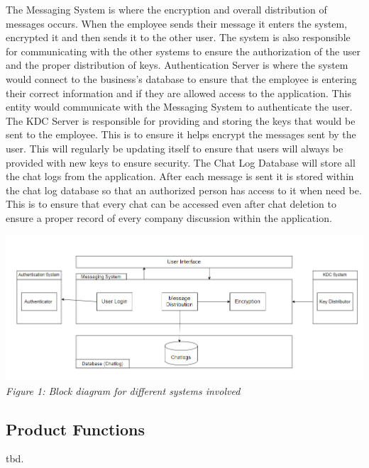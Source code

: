 \documentclass[]{article}
\begin{document}
\indent The Messaging System is where the encryption and overall distribution of messages occurs. When the employee sends their message it enters the system, encrypted it and then sends it to the other user. The system is also responsible for communicating with the other systems to ensure the authorization of the user and the proper distribution of keys.
\newline
\newline
\indent Authentication Server is where the system would connect to the business’s database to ensure that the employee is entering their correct information and if they are allowed access to the application. This entity would communicate with the Messaging System to authenticate the user.
\newline
\newline
\indent The KDC Server is responsible for providing and storing the keys that would be sent to the employee. This is to ensure it helps encrypt the messages sent by the user. This will regularly be updating itself to ensure that users will always be provided with new keys to ensure security.
\newline
\newline
\indent The Chat Log Database will store all the chat logs from the application. After each message is sent it is stored within the chat log database so that an authorized person has access to it when need be. This is to ensure that every chat can be accessed even after chat deletion to ensure a proper record of every company discussion within the application.
\newline
\begin{center}
    \includegraphics{Graphics/blockdiagram.png}\\
    \emph{Figure 1: Block diagram for different systems involved}
\end{center}

\subsection{Product Functions}
\label{sub:product_functions}
tbd.\\
\end{document}
